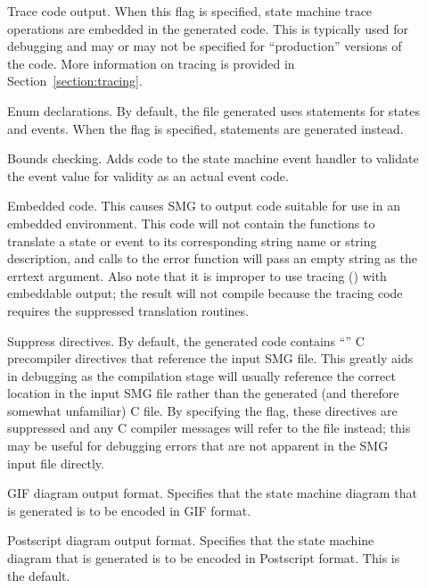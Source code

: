 \begin{description}
\item[] Trace code output.  When this flag is specified,
  state machine trace operations are embedded in the generated code.
  This is typically used for debugging and may or may not be specified
  for ``production'' versions of the code.  More information on
  tracing is provided in Section~\ref{section:tracing}.
         
\item[] Enum declarations.  By default, the
   file generated uses  statements
  for states and events.  When the  flag is specified,
   statements are generated instead.
         
\item[] Bounds checking.  Adds code to the state machine
  event handler to validate the event value for validity as an actual
  event code.
  
\item[] Embedded code.  This causes SMG to output code
  suitable for use in an embedded environment.  This code will not
  contain the functions to translate a state or event to its
  corresponding string name or string description, and calls to the
  error function will pass an empty string as the errtext argument.
  Also note that it is improper to use tracing () with
  embeddable output; the result will not compile because the tracing
  code requires the suppressed translation routines.
         
\item[] Suppress  directives.  By default, the
  generated code contains ``'' C precompiler directives
  that reference the input SMG file.  This greatly aids in debugging
  as the compilation stage will usually reference the correct location
  in the input SMG file rather than the generated (and therefore
  somewhat unfamiliar) C file.  By specifying the  flag,
  these directives are suppressed and any C compiler messages will
  refer to the  file instead; this may be useful for
  debugging errors that are not apparent in the SMG input file
  directly.
  
\item[] GIF diagram output format.  Specifies that the state
  machine diagram that is generated is to be encoded in GIF format.
         
\item[] Postscript diagram output format.  Specifies that the
  state machine diagram that is generated is to be encoded in
  Postscript format.  This is the default.
         

\end{description}
